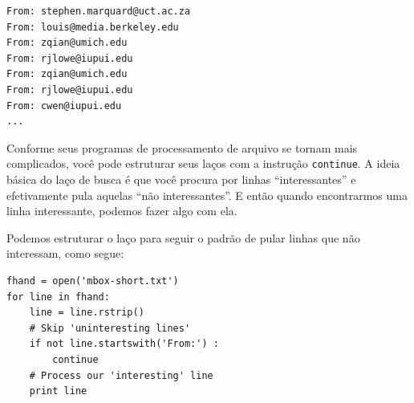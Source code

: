 \beforeverb
\begin{verbatim}
From: stephen.marquard@uct.ac.za
From: louis@media.berkeley.edu
From: zqian@umich.edu
From: rjlowe@iupui.edu
From: zqian@umich.edu
From: rjlowe@iupui.edu
From: cwen@iupui.edu
...
\end{verbatim}
\afterverb

Conforme seus programas de processamento de arquivo se tornam mais 
complicados, você pode estruturar seus laços com a instrução 
{\tt continue}. A ideia básica do laço de busca é que você procura
por linhas ``interessantes'' e efetivamente pula aquelas ``não interessantes''.
E então quando encontrarmos uma linha interessante, podemos fazer algo com ela.

Podemos estruturar o laço para seguir o padrão de
pular linhas que não interessam, como segue:

\beforeverb
\begin{verbatim}
fhand = open('mbox-short.txt')
for line in fhand:
    line = line.rstrip()
    # Skip 'uninteresting lines'
    if not line.startswith('From:') :
        continue
    # Process our 'interesting' line
    print line
\end{verbatim}
\afterverb


